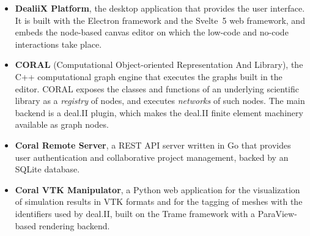 \documentclass[a4paper,12pt]{article}
\begin{document}
\begin{itemize}
    \item \textbf{DealiiX Platform}, the desktop application that provides
        the user interface. It is built with the Electron framework and the
        Svelte~5 web framework, and embeds the node-based canvas editor on
        which the low-code and no-code interactions take place.
    \item \textbf{CORAL} (Computational Object-oriented Representation And
        Library), the C++ computational graph engine that executes the
        graphs built in the editor. CORAL exposes the classes and functions
        of an underlying scientific library as a \emph{registry} of nodes,
        and executes \emph{networks} of such nodes. The main backend is a
        deal.II plugin, which makes the deal.II finite element machinery
        available as graph nodes.
    \item \textbf{Coral Remote Server}, a REST API server written in Go
        that provides user authentication and collaborative project
        management, backed by an SQLite database.
    \item \textbf{Coral VTK Manipulator}, a Python web application for the
        visualization of simulation results in VTK formats and for the
        tagging of meshes with the identifiers used by deal.II, built on the
        Trame framework with a ParaView-based rendering backend.
\end{itemize}
\end{document}
